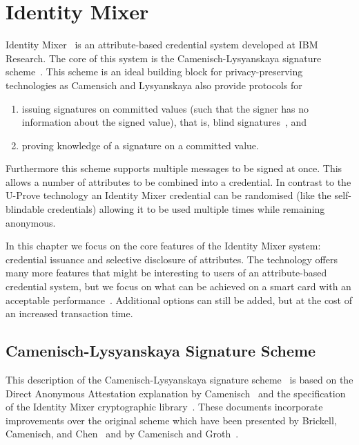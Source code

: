 \chapter{Identity Mixer}

Identity Mixer~\cite{IdemixCrypto2012,CamenischH02} is an attribute-based
credential system developed at IBM Research. The core of this system is the
Camenisch-Lysyanskaya signature scheme~\cite{CamenischLysyanskaya2002,Lysyanskaya2002}.
This scheme is an ideal building block for privacy-preserving technologies as
Camensich and Lysyanskaya also provide protocols for
\begin{enumerate}
  \item issuing signatures on committed values (such that the signer has no
    information about the signed value), that is, blind
    signatures~\cite{Chaum1983}, and
  \item proving knowledge of a signature on a committed value.
\end{enumerate}
Furthermore this scheme supports multiple messages to be signed at once. This
allows a number of attributes to be combined into a credential. In contrast to
the U-Prove technology an Identity Mixer credential can be randomised (like the
self-blindable credentials) allowing it to be used multiple times while
remaining anonymous.

In this chapter we focus on the core features of the Identity Mixer system:
credential issuance and selective disclosure of attributes. The technology
offers many more features that might be interesting to users of an
attribute-based credential system, but we focus on what can be achieved on a
smart card with an acceptable performance~\cite{VullersAlpar2013}. Additional
options can still be added, but at the cost of an increased transaction time.

\section{Camenisch-Lysyanskaya Signature Scheme}

This description of the Camenisch-Lysyanskaya signature
scheme~\cite{CamenischLysyanskaya2002,Lysyanskaya2002} is based on the Direct
Anonymous Attestation explanation by Camenisch~\cite{Camenisch2007} and the
specification of the Identity Mixer cryptographic
library~\cite{IdemixCrypto2012}. These documents incorporate improvements over
the original scheme which have been presented by Brickell, Camenisch, and
Chen~\cite{BrickellCC2004} and by Camenisch and Groth~\cite{CamenischGroth2004}.

